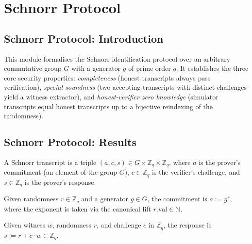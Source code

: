 \section{Schnorr Protocol}
\subsection*{Schnorr Protocol: Introduction}

This module formalises the Schnorr identification protocol over an arbitrary
commutative group $G$ with a generator $g$ of prime order $q$.  It establishes
the three core security properties: \emph{completeness} (honest transcripts
always pass verification), \emph{special soundness} (two accepting transcripts
with distinct challenges yield a witness extractor), and \emph{honest-verifier
zero knowledge} (simulator transcripts equal honest transcripts up to a
bijective reindexing of the randomness).

\subsection*{Schnorr Protocol: Results}

\begin{definition}
\label{Schnorr.Transcript}
\leanok
A Schnorr transcript is a triple $(a, c, s) \in G \times \mathbb{Z}_q \times
\mathbb{Z}_q$, where $a$ is the prover's commitment (an element of the group
$G$), $c \in \mathbb{Z}_q$ is the verifier's challenge, and $s \in \mathbb{Z}_q$
is the prover's response.
\end{definition}

\begin{definition}
\label{Schnorr.commit}
\leanok
Given randomness $r \in \mathbb{Z}_q$ and a generator $g \in G$, the commitment
is $a := g^{r}$, where the exponent is taken via the canonical lift
$r.\mathrm{val} \in \mathbb{N}$.
\end{definition}

\begin{definition}
\label{Schnorr.respond}
\leanok
Given witness $w$, randomness $r$, and challenge $c$ in $\mathbb{Z}_q$, the
response is $s := r + c \cdot w \in \mathbb{Z}_q$.
\end{definition}

